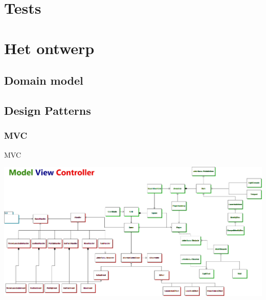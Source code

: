 \documentclass[t]{beamer}
\begin{document}
\section{Tests}
\begin{frame}
\begin{center}

\end{center}
\end{frame}

\section{Het ontwerp}

\subsection{Domain model}

\begin{frame}
\begin{center}
\end{center}
\end{frame}

\subsection{Design Patterns}

\subsubsection{MVC}

\begin{frame}{MVC}
\begin{center}
\includegraphics[width=1\linewidth]{images/overview}
\end{center}
\end{frame}
\end{document}
